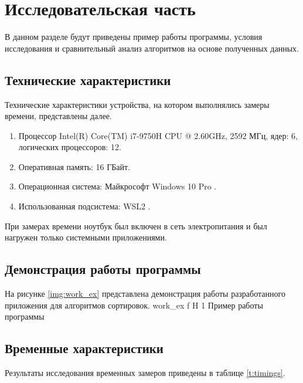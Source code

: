 \chapter{Исследовательская часть}

В данном разделе будут приведены пример работы программы, условия исследования   и сравнительный анализ алгоритмов на основе полученных данных.

\section{Технические характеристики}

Технические характеристики устройства, на котором выполнялись замеры времени, представлены далее.

\begin{enumerate}
	\item Процессор	Intel(R) Core(TM) i7-9750H CPU @ 2.60GHz, 2592 МГц, ядер: 6, логических процессоров: 12.
	\item Оперативная память: 16 ГБайт.
	\item Операционная система: Майкрософт Windows 10 Pro \cite{windows}.
	\item Использованная подсистема: WSL2 \cite{WSL2}.
\end{enumerate}

При замерах времени ноутбук был включен в сеть электропитания и был нагружен только системными приложениями.


\section{Демонстрация работы программы}

На рисунке \ref{img:work_ex} представлена демонстрация работы разработанного приложения для алгоритмов сортировок.
{work_ex} %
{f} %
{H} %
{1\textwidth} %
{Пример работы программы} %




\section{Временные характеристики}

Результаты исследования временных замеров  приведены в таблице \ref{t:timings}.

